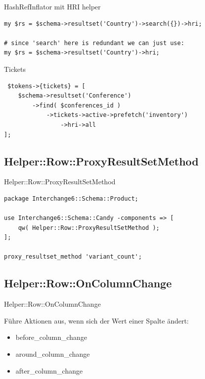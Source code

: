 \begin{frame}[fragile]{HashRefInflator mit HRI helper}
\begin{lstlisting}
my $rs = $schema->resultset('Country')->search({})->hri;

# since 'search' here is redundant we can just use:
my $rs = $schema->resultset('Country')->hri;
\end{lstlisting}
\end{frame}

\begin{frame}[fragile]{Tickets}
\begin{lstlisting}
 $tokens->{tickets} = [
    $schema->resultset('Conference')
        ->find( $conferences_id )
            ->tickets->active->prefetch('inventory')
                ->hri->all 
];
\end{lstlisting}
\end{frame}

\subsection{Helper::Row::ProxyResultSetMethod}

\begin{frame}[fragile]{Helper::Row::ProxyResultSetMethod}
\begin{lstlisting}
package Interchange6::Schema::Product;

use Interchange6::Schema::Candy -components => [
    qw( Helper::Row::ProxyResultSetMethod );
];

proxy_resultset_method 'variant_count';
\end{lstlisting}
\end{frame}

\subsection{Helper::Row::OnColumnChange}

\begin{frame}[fragile]{Helper::Row::OnColumnChange}

Führe Aktionen aus, wenn sich der Wert
einer Spalte ändert:

\begin{itemize}
\item before\_column\_change
\item around\_column\_change
\item after\_column\_change
\end{itemize}

\end{frame}

